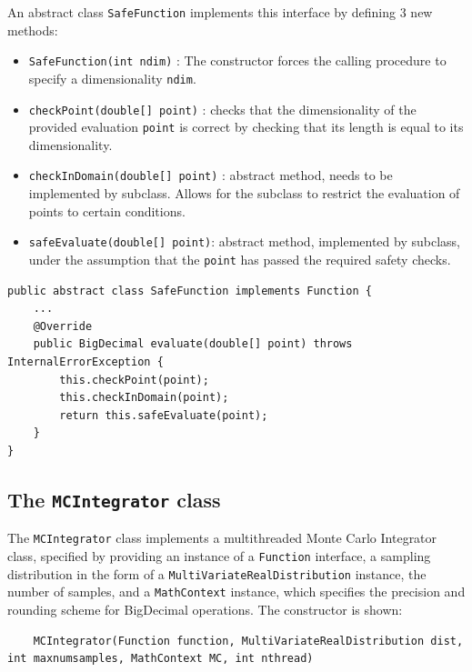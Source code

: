 An abstract class \texttt{SafeFunction} implements this interface by defining 3 new methods:
\begin{itemize}
    \item \texttt{SafeFunction(int ndim)} : The constructor forces the calling procedure to specify a dimensionality \texttt{ndim}.
    \item \texttt{checkPoint(double[] point)} : checks that the dimensionality of the provided evaluation \texttt{point} is correct by checking that its length is equal to its dimensionality.
    \item \texttt{checkInDomain(double[] point)} : abstract method, needs to be implemented by subclass. Allows for the subclass to restrict the evaluation of points to certain conditions.
    \item \texttt{safeEvaluate(double[] point)}: abstract method, implemented by subclass, under the assumption that the \texttt{point} has passed the required safety checks.
\end{itemize}

\begin{lstlisting}[caption= Implementation of \texttt{Function.evaluate()} method by the \texttt{safeFunction} abstract class]
public abstract class SafeFunction implements Function {
    ...
    @Override
    public BigDecimal evaluate(double[] point) throws InternalErrorException {
        this.checkPoint(point);
        this.checkInDomain(point);
        return this.safeEvaluate(point);
    }
}    
\end{lstlisting}

\subsection*{The \texttt{MCIntegrator} class}

The \texttt{MCIntegrator} class implements a multithreaded Monte Carlo Integrator class, specified by providing an instance of a \texttt{Function} interface, a sampling distribution in the form of a \texttt{MultiVariateRealDistribution} instance, the number of samples, and a \texttt{MathContext} instance, which specifies the precision and rounding scheme for BigDecimal operations. The constructor is shown:
\begin{lstlisting}
    MCIntegrator(Function function, MultiVariateRealDistribution dist, int maxnumsamples, MathContext MC, int nthread) 
\end{lstlisting}


